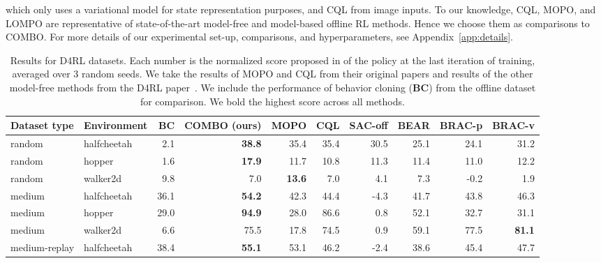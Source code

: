 which only uses a variational model for state representation purposes, and CQL from image inputs. To our knowledge, CQL, MOPO, and LOMPO are representative of state-of-the-art model-free and model-based offline RL methods. Hence we choose them as comparisons to COMBO.
For more details of our experimental set-up, comparisons, and hyperparameters, see Appendix~\ref{app:details}.

\begin{table*}[t!]
\centering
\vspace*{-0.3cm}
\caption{\footnotesize Results for D4RL datasets. %
Each number is the normalized score proposed in \cite{fu2020d4rl} of the policy at the last iteration of training, averaged over 3 random seeds. We take the results of MOPO and CQL from their original papers and results of the other model-free methods from the D4RL paper~\citep{fu2020d4rl}.
We include the performance of behavior cloning (\textbf{BC}) from the offline dataset for comparison. We bold the highest score across all methods.
}
\vspace*{0.1cm}
\small
\begin{tabular}{l|l|r|r|r|r|r|r|r|r}
\toprule
\textbf{\!\!\!Dataset type\!\!} & \textbf{Environment} & \textbf{BC} & \textbf{COMBO (ours)}& \textbf{MOPO}& \textbf{CQL} & \textbf{SAC-off} & \textbf{BEAR} & \textbf{BRAC-p} & \textbf{BRAC-v}\\ \midrule
\!\!\!random & halfcheetah & 2.1 & \textbf{38.8} & 35.4 & 35.4 & 30.5 & 25.1 & 24.1 & 31.2 \\
\!\!\!random & hopper & 1.6 & \textbf{17.9} & 11.7 & 10.8 & 11.3 & 11.4 & 11.0 & 12.2 \\
\!\!\!random & walker2d & 9.8 & 7.0 & \textbf{13.6}  & 7.0 & 4.1 & 7.3 & -0.2 & 1.9 \\
\!\!\!medium & halfcheetah & 36.1 & \textbf{54.2} & 42.3  & 44.4 & -4.3 & 41.7 & 43.8 & 46.3 \\
\!\!\!medium & hopper & 29.0 & \textbf{94.9} & 28.0  & 86.6 & 0.8 & 52.1 & 32.7 & 31.1 \\
\!\!\!medium & walker2d & 6.6 & 75.5 & 17.8  & 74.5 & 0.9 & 59.1 & 77.5 & \textbf{81.1} \\
\!\!\!medium-replay & halfcheetah & 38.4  & \textbf{55.1} & 53.1  & 46.2 & -2.4 & 38.6 & 45.4 & 47.7 \\

\end{tabular}
\end{table*}
